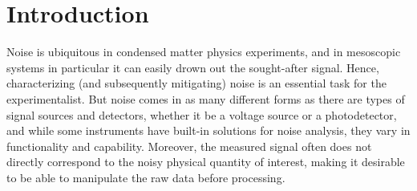 \chapter{Introduction}\label{ch:speck:introduction}
Noise is ubiquitous in condensed matter physics experiments, and in mesoscopic systems in particular it can easily drown out the sought-after signal.
Hence, characterizing (and subsequently mitigating) noise is an essential task for the experimentalist.
But noise comes in as many different forms as there are types of signal sources and detectors, whether it be a voltage source or a photodetector, and while some instruments have built-in solutions for noise analysis, they vary in functionality and capability.
Moreover, the measured signal often does not directly correspond to the noisy physical quantity of interest, making it desirable to be able to manipulate the raw data before processing.

